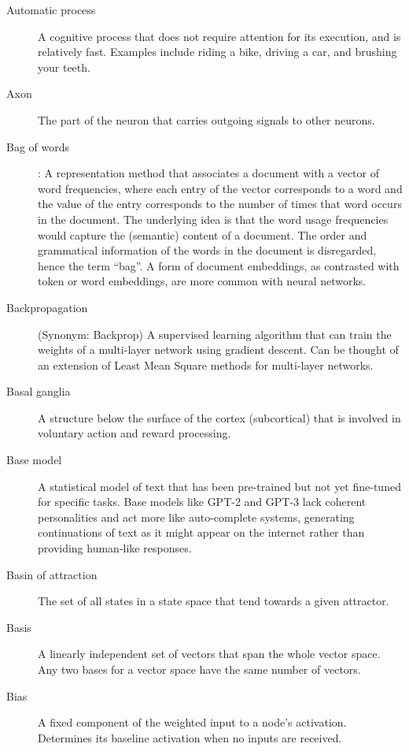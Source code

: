 \begin{description}
\item[Automatic process] A cognitive process that does not require attention for its execution, and is relatively fast. Examples include riding a bike, driving a car, and brushing your teeth.

\item[Axon] The part of the neuron that carries outgoing signals to other neurons.

\item[Bag of words]: A representation method that associates a document with a vector of word frequencies, where each entry of the vector corresponds to a word and the value of the entry corresponds to the number of times that word occurs in the document. The underlying idea is that the word usage frequencies would capture the (semantic) content of a document. The order and grammatical information of the words in the document is disregarded, hence the term ``bag''.  A form of document embeddings, as contrasted with token or word embeddings, are more common with neural networks.

\item[Backpropagation] (Synonym: Backprop) A supervised learning algorithm that can train the weights of a multi-layer network using gradient descent. Can be thought of an extension of Least Mean Square methods for multi-layer networks. 

\item[Basal ganglia] A structure below the surface of the cortex (subcortical) that is involved in voluntary action and reward processing.

\item[Base model] A statistical model of text that has been pre-trained but not yet fine-tuned for specific tasks. Base models like GPT-2 and GPT-3 lack coherent personalities and act more like auto-complete systems, generating continuations of text as it might appear on the internet rather than providing human-like responses.

\item[Basin of attraction] The set of all states in a state space that tend 
towards a given attractor.

\item[Basis] A linearly independent set of vectors that span the whole vector space. Any two bases for a vector space have the same number of vectors.

\item[Bias] A fixed component of the weighted input to a node's activation. Determines its baseline activation when no inputs are received.


\end{description}
